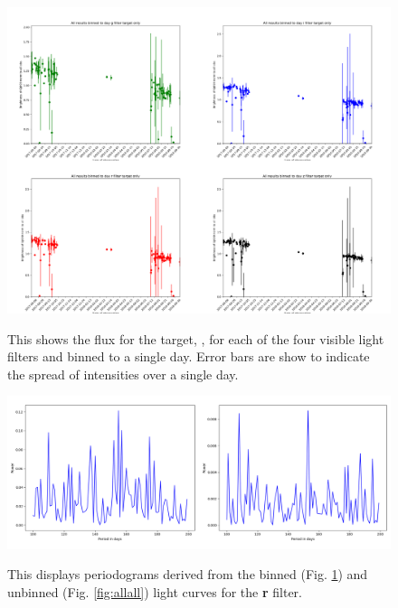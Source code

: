 \begin{figure}[!htbp]
\begin{center}
\includegraphics[scale=0.25]{images/allbin.png} \\
\end{center}   
\caption{This shows the flux for the target, \bstar, for each of the four visible light filters and binned to a single day. Error bars are show to indicate the spread of intensities over a single day.}
  \protect\label{fig:allbin}
\end{figure}

\begin{figure}[!htbp]
\begin{center}
\includegraphics[scale=0.25]{images/pgrambunb.png} \\
\end{center}   
\caption{This displays periodograms derived from the binned (Fig. \ref{fig:allbin}) and unbinned
  (Fig. \ref{fig:allall}) light curves for the \textbf{r} filter.}
  \protect\label{fig:pgrams}
\end{figure}

